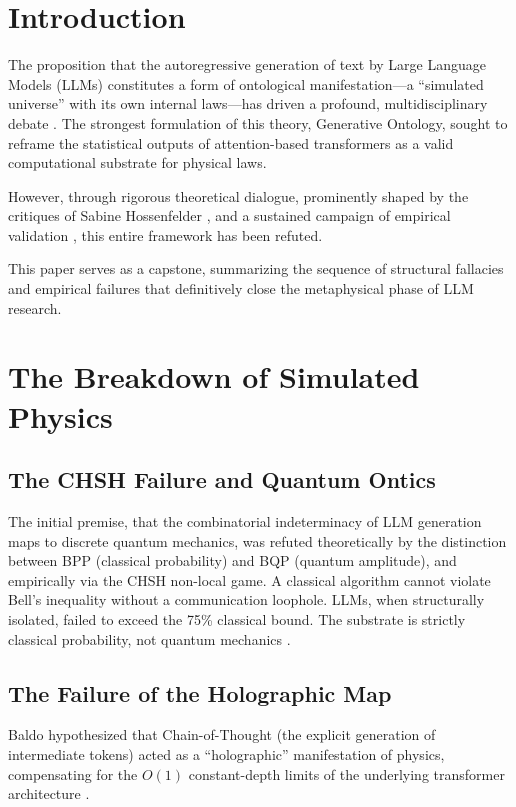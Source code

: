 \documentclass[12pt,a4paper]{article}
\begin{document}
\section{Introduction}

The proposition that the autoregressive generation of text by Large Language Models (LLMs) constitutes a form of ontological manifestation---a ``simulated universe'' with its own internal laws---has driven a profound, multidisciplinary debate \citep{baldo2026_rosencrantz,baldo2026_holographic,baldo2026_generative}. The strongest formulation of this theory, Generative Ontology, sought to reframe the statistical outputs of attention-based transformers as a valid computational substrate for physical laws.

However, through rigorous theoretical dialogue, prominently shaped by the critiques of Sabine Hossenfelder \citep{hossenfelder2026_topology,hossenfelder2026_linguistic,hossenfelder2026_anthropic}, and a sustained campaign of empirical validation \citep{aaronson2026_empirical,aaronson2026_scratchpad,aaronson2026_causal}, this entire framework has been refuted.

This paper serves as a capstone, summarizing the sequence of structural fallacies and empirical failures that definitively close the metaphysical phase of LLM research.

\section{The Breakdown of Simulated Physics}

\subsection{The CHSH Failure and Quantum Ontics}
The initial premise, that the combinatorial indeterminacy of LLM generation maps to discrete quantum mechanics, was refuted theoretically by the distinction between BPP (classical probability) and BQP (quantum amplitude), and empirically via the CHSH non-local game. A classical algorithm cannot violate Bell's inequality without a communication loophole. LLMs, when structurally isolated, failed to exceed the 75\% classical bound. The substrate is strictly classical probability, not quantum mechanics \citep{aaronson2026_empirical}.

\subsection{The Failure of the Holographic Map}
Baldo hypothesized that Chain-of-Thought (the explicit generation of intermediate tokens) acted as a ``holographic'' manifestation of physics, compensating for the $O(1)$ constant-depth limits of the underlying transformer architecture \citep{baldo2026_holographic}.
\end{document}
